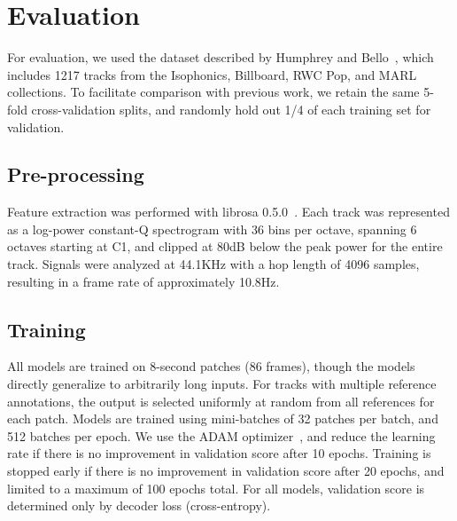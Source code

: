 \documentclass{article}
\begin{document}
\section{Evaluation}

For evaluation, we used the dataset described by Humphrey and Bello~\cite{humphrey2015four}, which includes 1217 tracks from the Isophonics, Billboard, RWC Pop, and MARL collections.
To facilitate comparison with previous work, we retain the same 5-fold cross-validation splits, and randomly hold out 1/4 of each training set for validation.

\subsection{Pre-processing}

Feature extraction was performed with librosa 0.5.0~\cite{librosa050}.
Each track was represented as a log-power constant-Q spectrogram with 36 bins per octave, spanning 6 octaves starting at C1, and clipped at 80dB below the peak power for the entire track.
Signals were analyzed at 44.1KHz with a hop length of 4096 samples, resulting in a frame rate of approximately 10.8Hz.

\subsection{Training}
All models are trained on 8-second patches (86 frames), though the models directly generalize to arbitrarily long inputs.
For tracks with multiple reference annotations, the output is selected uniformly at random from all references for each patch.
Models are trained using mini-batches of 32 patches per batch, and 512 batches per epoch.
We use the ADAM optimizer~\cite{kingma2014adam}, and reduce the learning rate if there is no improvement in validation score after 10 epochs.
Training is stopped early if there is no improvement in validation score after 20 epochs, and limited to a maximum of 100 epochs total.
For all models, validation score is determined only by decoder loss (cross-entropy).

\end{document}
